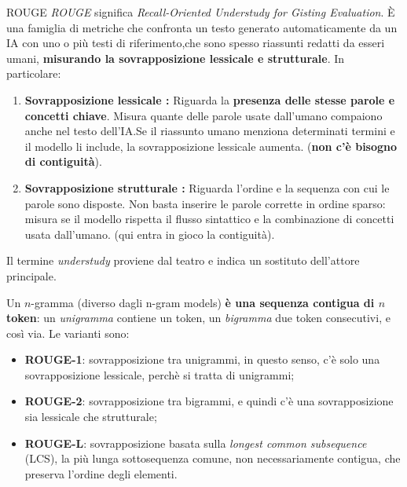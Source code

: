 \begin{definition}{ROUGE}
\emph{ROUGE} significa \emph{Recall-Oriented Understudy for Gisting Evaluation}. È una famiglia di metriche che confronta un testo generato automaticamente da un IA con uno o più testi di riferimento,che sono spesso riassunti redatti da esseri umani, \textbf{misurando la sovrapposizione lessicale e strutturale}.
In particolare:
\begin{enumerate}
    \item \textbf{Sovrapposizione lessicale : } Riguarda la \textbf{presenza delle stesse parole e concetti chiave}. Misura quante delle parole usate dall'umano compaiono anche nel testo dell'IA.Se il riassunto umano menziona determinati termini e il modello li include, la sovrapposizione lessicale aumenta. (\textbf{non c'è bisogno di contiguità}).
    \item \textbf{Sovrapposizione strutturale : } Riguarda l'ordine e la sequenza con cui le parole sono disposte. Non basta inserire le parole corrette in ordine sparso: misura se il modello rispetta il flusso sintattico e la combinazione di concetti usata dall'umano. (qui entra in gioco la contiguità).
\end{enumerate}
\end{definition}

\begin{observation}{}
Il termine \emph{understudy} proviene dal teatro e indica un sostituto dell'attore principale.    
\end{observation}

Un $n$-gramma (diverso dagli n-gram models) \textbf{è una sequenza contigua di $n$ token}: un \emph{unigramma} contiene un token, un \emph{bigramma} due token consecutivi, e così via. Le varianti sono:
\begin{itemize}
\item \textbf{ROUGE-1}: sovrapposizione tra unigrammi, in questo senso, c'è solo una sovrapposizione lessicale, perchè si tratta di unigrammi;
\item \textbf{ROUGE-2}: sovrapposizione tra bigrammi, e quindi c'è una sovrapposizione sia lessicale che strutturale;
\item \textbf{ROUGE-L}: sovrapposizione basata sulla \emph{longest common subsequence} (LCS), la più lunga sottosequenza comune, non necessariamente contigua, che preserva l'ordine degli elementi.
\end{itemize}

\newpage

